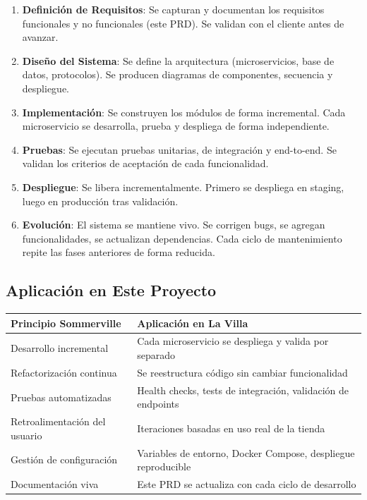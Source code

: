 \documentclass[11pt,a4paper]{article}
\begin{document}
\begin{enumerate}
    \item \textbf{Definición de Requisitos}: Se capturan y documentan los requisitos funcionales y no funcionales (este PRD). Se validan con el cliente antes de avanzar.

    \item \textbf{Diseño del Sistema}: Se define la arquitectura (microservicios, base de datos, protocolos). Se producen diagramas de componentes, secuencia y despliegue.

    \item \textbf{Implementación}: Se construyen los módulos de forma incremental. Cada microservicio se desarrolla, prueba y despliega de forma independiente.

    \item \textbf{Pruebas}: Se ejecutan pruebas unitarias, de integración y end-to-end. Se validan los criterios de aceptación de cada funcionalidad.

    \item \textbf{Despliegue}: Se libera incrementalmente. Primero se despliega en staging, luego en producción tras validación.

    \item \textbf{Evolución}: El sistema se mantiene vivo. Se corrigen bugs, se agregan funcionalidades, se actualizan dependencias. Cada ciclo de mantenimiento repite las fases anteriores de forma reducida.
\end{enumerate}

\subsection{Aplicación en Este Proyecto}

\begin{tabularx}{\textwidth}{|l|X|}
\hline
\textbf{Principio Sommerville} & \textbf{Aplicación en La Villa} \\
\hline
Desarrollo incremental & Cada microservicio se despliega y valida por separado \\
Refactorización continua & Se reestructura código sin cambiar funcionalidad \\
Pruebas automatizadas & Health checks, tests de integración, validación de endpoints \\
Retroalimentación del usuario & Iteraciones basadas en uso real de la tienda \\
Gestión de configuración & Variables de entorno, Docker Compose, despliegue reproducible \\
Documentación viva & Este PRD se actualiza con cada ciclo de desarrollo \\
\hline
\end{tabularx}
\end{document}
